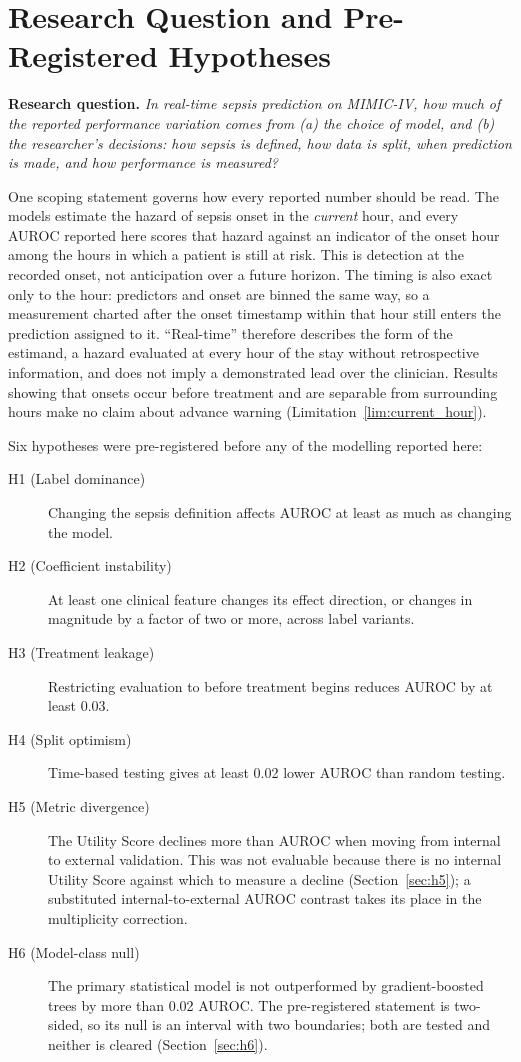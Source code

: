 \section{Research Question and Pre-Registered Hypotheses}
\label{sec:rq}

\noindent\textbf{Research question.} \textit{In real-time sepsis prediction on
MIMIC-IV, how much of the reported performance variation comes from (a) the
choice of model, and (b) the researcher's decisions: how sepsis is defined,
    how data is split, when prediction is made, and how performance is measured?}

One scoping statement governs how every reported number should be read. The
models estimate the hazard of sepsis onset in the \emph{current} hour, and every
AUROC reported here scores that hazard against an indicator of the onset hour
among the hours in which a patient is still at risk. This is detection at the
recorded onset, not anticipation over a future horizon. The timing is also
exact only to the hour: predictors and onset are binned the same way, so a
measurement charted after the onset timestamp within that hour still enters
the prediction assigned to it. ``Real-time'' therefore describes the form of
the estimand, a hazard evaluated at every hour of the stay without
retrospective information, and does not imply a demonstrated lead over the
clinician. Results showing that onsets occur before treatment and are separable
from surrounding hours make no claim about advance warning
(Limitation~\ref{lim:current_hour}).

Six hypotheses were pre-registered before any of the modelling reported here:

\begin{description}
    \item[H1 (Label dominance)] Changing the sepsis definition affects AUROC at
    least as much as changing the model.
    \item[H2 (Coefficient instability)] At least one clinical feature changes its
    effect direction, or changes in magnitude by a factor of two or more, across
    label variants.
    \item[H3 (Treatment leakage)] Restricting evaluation to before treatment
    begins reduces AUROC by at least 0.03.
    \item[H4 (Split optimism)] Time-based testing gives at least 0.02 lower AUROC
    than random testing.
    \item[H5 (Metric divergence)] The Utility Score declines more than AUROC when
    moving from internal to external validation. This was not evaluable
    because there is no internal Utility Score against which to measure a
    decline (Section~\ref{sec:h5}); a substituted internal-to-external AUROC
    contrast takes its place in the multiplicity correction.
    \item[H6 (Model-class null)] The primary statistical model is not
    outperformed by gradient-boosted trees by more than 0.02 AUROC. The
    pre-registered statement is two-sided, so its null is an interval with two
    boundaries; both are tested and neither is cleared
    (Section~\ref{sec:h6}).
\end{description}

